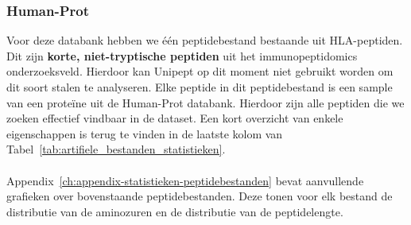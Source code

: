 \subsubsection{Human-Prot}
Voor deze databank hebben we één peptidebestand bestaande uit HLA-peptiden.
Dit zijn \textbf{korte, niet-tryptische peptiden} uit het immunopeptidomics onderzoeksveld.
Hierdoor kan Unipept op dit moment niet gebruikt worden om dit soort stalen te analyseren.
Elke peptide in dit peptidebestand is een sample van een proteïne uit de Human-Prot databank.
Hierdoor zijn alle peptiden die we zoeken effectief vindbaar in de dataset.
Een kort overzicht van enkele eigenschappen is terug te vinden in de laatste kolom van Tabel~\ref{tab:artifiele_bestanden_statistieken}.
\\ \\
Appendix~\ref{ch:appendix-statistieken-peptidebestanden} bevat aanvullende grafieken over bovenstaande peptidebestanden.
Deze tonen voor elk bestand de distributie van de aminozuren en de distributie van de peptidelengte.


